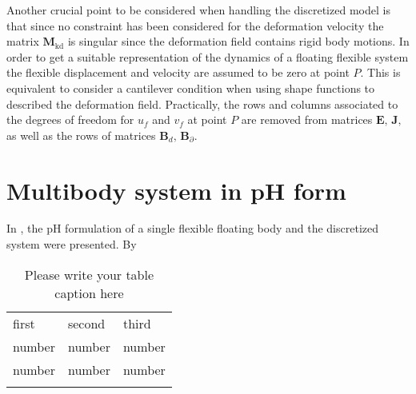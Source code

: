 Another crucial point to be considered when handling the discretized model is that since no constraint has been considered for the deformation velocity the matrix $\bm{M}_{\text{kd}}$ is singular since the deformation field contains rigid body motions. In order to get a suitable representation of the dynamics of a floating flexible system the flexible displacement and velocity are assumed to be zero at point $P$. This is equivalent to consider a cantilever condition when using shape functions to described the deformation field. Practically, the rows and columns associated to the degrees of freedom for $u_f$ and $v_f$ at point $P$ are removed from matrices $\bm{E}, \, \bm{J},$ as well as the rows of matrices $\bm{B}_d, \, \bm{B}_\partial$.


\section{Multibody system in pH form}
In ,  the pH formulation of a single flexible floating body and the discretized system were presented. By 

\begin{table}
\caption{Please write your table caption here}
\label{tab:1}       %
\begin{tabular}{lll}
\hline\noalign{\smallskip}
first & second & third  \\
\noalign{\smallskip}\hline\noalign{\smallskip}
number & number & number \\
number & number & number \\
\noalign{\smallskip}\hline
\end{tabular}
\end{table}




 




